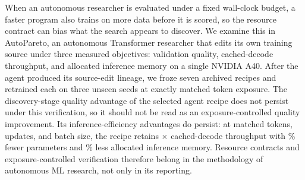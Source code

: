 When an autonomous researcher is evaluated under a fixed wall-clock budget, a faster program also trains on more data before it is scored, so the resource contract can bias what the search appears to discover.
We examine this in AutoPareto, an autonomous Transformer researcher that edits its own training source under three measured objectives: validation quality, cached-decode throughput, and allocated inference memory on a single NVIDIA A40.
After the agent produced its source-edit lineage, we froze seven archived recipes and retrained each on three unseen seeds at exactly matched token exposure.
The discovery-stage quality advantage of the selected agent recipe does not persist under this verification, so it should not be read as an exposure-controlled quality improvement.
Its inference-efficiency advantages do persist: at matched tokens, updates, and batch size, the recipe retains \DecodeRatio$\times$ cached-decode throughput with \ParameterReduction\% fewer parameters and \MemoryReduction\% less allocated inference memory.
Resource contracts and exposure-controlled verification therefore belong in the methodology of autonomous ML research, not only in its reporting.
